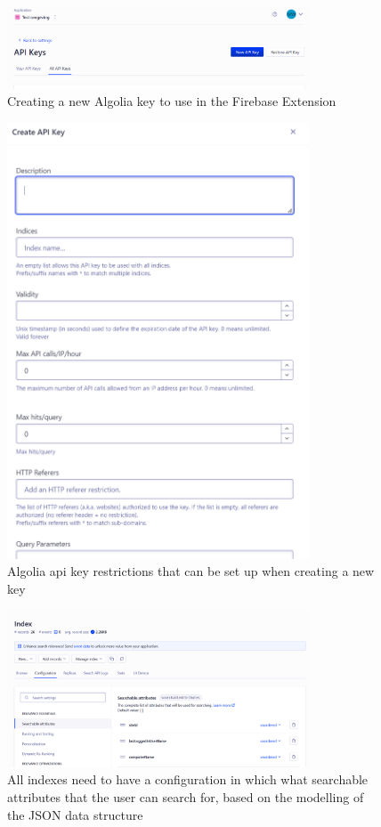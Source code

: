 \begin{figure}[htbp]
  \centering
  \includegraphics[width=0.8\textwidth]{Figures/Create new Algolia keys.png}
  \caption{Creating a new Algolia key to use in the Firebase Extension}
\end{figure}

\begin{figure}[htbp]
  \centering
  \includegraphics[width=0.8\textwidth]{Figures/Algolia API Key restrictions.png}
  \caption{Algolia \acrshort{api} key restrictions that can be set up when creating a new key}
\end{figure}

\begin{figure}[htbp]
  \centering
  \includegraphics[width=0.8\textwidth]{Figures/Algolia Configuration.png}
  \caption{All indexes need to have a configuration in which what searchable attributes that the user can search for, based on the
    modelling of the JSON data structure}

\end{figure}

